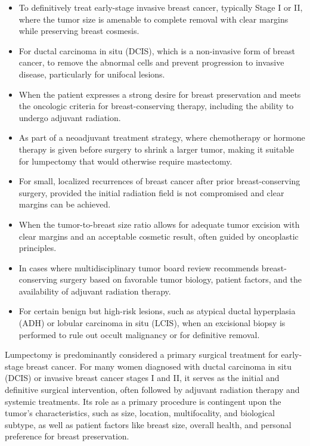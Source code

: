 \begin{itemize}
  \item To definitively treat early-stage invasive breast cancer, typically Stage I or II, where the tumor size is amenable to complete removal with clear margins while preserving breast cosmesis.
  \item For ductal carcinoma in situ (DCIS), which is a non-invasive form of breast cancer, to remove the abnormal cells and prevent progression to invasive disease, particularly for unifocal lesions.
  \item When the patient expresses a strong desire for breast preservation and meets the oncologic criteria for breast-conserving therapy, including the ability to undergo adjuvant radiation.
  \item As part of a neoadjuvant treatment strategy, where chemotherapy or hormone therapy is given before surgery to shrink a larger tumor, making it suitable for lumpectomy that would otherwise require mastectomy.
  \item For small, localized recurrences of breast cancer after prior breast-conserving surgery, provided the initial radiation field is not compromised and clear margins can be achieved.
  \item When the tumor-to-breast size ratio allows for adequate tumor excision with clear margins and an acceptable cosmetic result, often guided by oncoplastic principles.
  \item In cases where multidisciplinary tumor board review recommends breast-conserving surgery based on favorable tumor biology, patient factors, and the availability of adjuvant radiation therapy.
  \item For certain benign but high-risk lesions, such as atypical ductal hyperplasia (ADH) or lobular carcinoma in situ (LCIS), when an excisional biopsy is performed to rule out occult malignancy or for definitive removal.
\end{itemize}

Lumpectomy is predominantly considered a primary surgical treatment for early-stage breast cancer. For many women diagnosed with ductal carcinoma in situ (DCIS) or invasive breast cancer stages I and II, it serves as the initial and definitive surgical intervention, often followed by adjuvant radiation therapy and systemic treatments. Its role as a primary procedure is contingent upon the tumor's characteristics, such as size, location, multifocality, and biological subtype, as well as patient factors like breast size, overall health, and personal preference for breast preservation.

